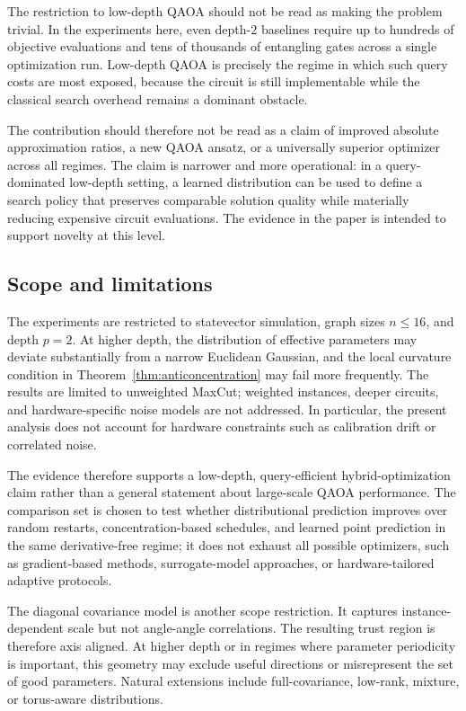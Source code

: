 \documentclass[aps,prx,reprint,superscriptaddress,longbibliography]{revtex4-2}
\newcommand{\QAOA}{\textnormal{\textsc{QAOA}}}
\begin{document}
The restriction to low-depth \QAOA{} should not be read as making the problem
trivial. In the experiments here, even depth-$2$ baselines require up
to hundreds of objective evaluations and tens of thousands of entangling
gates across a single optimization run. Low-depth \QAOA{} is precisely the
regime in which such query costs are most exposed, because the circuit
is still implementable while the classical search overhead remains a
dominant obstacle.

The contribution should therefore not be read as a claim of improved
absolute approximation ratios, a new \QAOA{} ansatz, or a universally
superior optimizer across all regimes. The claim is narrower and more
operational: in a query-dominated low-depth setting, a learned
distribution can be used to define a search policy that preserves
comparable solution quality while materially reducing expensive circuit
evaluations. The evidence in the paper is intended to support novelty
at this level.

\subsection{Scope and limitations}
\label{sec:limitations}

The experiments are restricted to statevector simulation, graph sizes
$n \le 16$, and depth $p{=}2$. At higher depth, the distribution of
effective parameters may deviate substantially from a narrow
Euclidean Gaussian, and the local curvature condition in
Theorem~\ref{thm:anticoncentration} may fail more frequently. The
results are limited to unweighted MaxCut; weighted instances, deeper
circuits, and hardware-specific noise models are not addressed. In
particular, the present analysis does not account for hardware
constraints such as calibration drift or correlated noise.

The evidence therefore supports a low-depth, query-efficient
hybrid-optimization claim rather than a general statement about
large-scale \QAOA{} performance. The comparison set is chosen to test
whether distributional prediction improves over random restarts,
concentration-based schedules, and learned point prediction in the same
derivative-free regime; it does not exhaust all possible optimizers,
such as gradient-based methods, surrogate-model approaches, or
hardware-tailored adaptive protocols.

The diagonal covariance model is another scope restriction. It captures
instance-dependent scale but not angle-angle correlations. The resulting
trust region is therefore axis aligned. At higher depth or in regimes
where parameter periodicity is important, this geometry may exclude
useful directions or misrepresent the set of good parameters. Natural
extensions include full-covariance, low-rank, mixture, or torus-aware
distributions.
\end{document}
